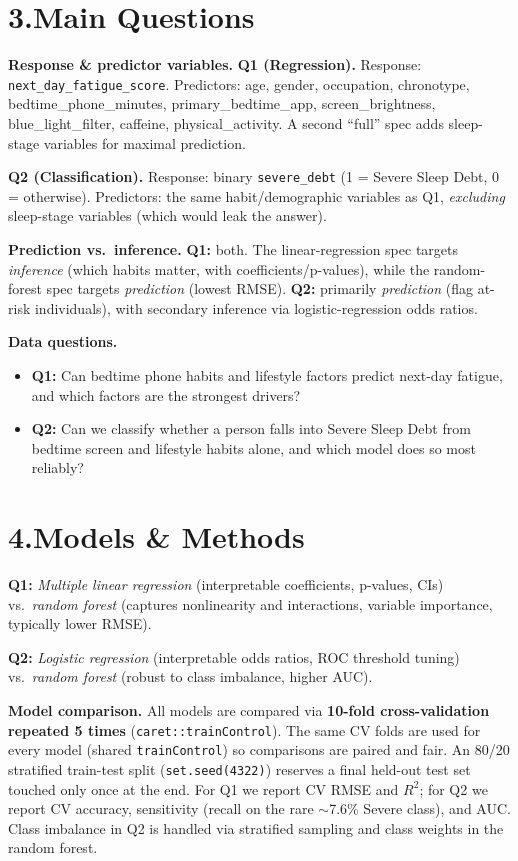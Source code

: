 \documentclass[10pt]{article}
\begin{document}
\section*{3.\quad Main Questions}

\textbf{Response \& predictor variables.}\quad
\textbf{Q1 (Regression).} Response: \texttt{next\_day\_fatigue\_score}.
Predictors: age, gender, occupation, chronotype, bedtime\_phone\_minutes, primary\_bedtime\_app, screen\_brightness, blue\_light\_filter, caffeine, physical\_activity. A second ``full'' spec adds sleep-stage variables for maximal prediction.

\textbf{Q2 (Classification).} Response: binary \texttt{severe\_debt} (1 = Severe Sleep Debt, 0 = otherwise).
Predictors: the same habit/demographic variables as Q1, \emph{excluding} sleep-stage variables (which would leak the answer).

\textbf{Prediction vs.\ inference.}\quad
\textbf{Q1:} both. The linear-regression spec targets \emph{inference} (which habits matter, with coefficients/p-values), while the random-forest spec targets \emph{prediction} (lowest RMSE).
\textbf{Q2:} primarily \emph{prediction} (flag at-risk individuals), with secondary inference via logistic-regression odds ratios.

\textbf{Data questions.}\quad
\begin{itemize}
  \item \textbf{Q1:} Can bedtime phone habits and lifestyle factors predict next-day fatigue, and which factors are the strongest drivers?
  \item \textbf{Q2:} Can we classify whether a person falls into Severe Sleep Debt from bedtime screen and lifestyle habits alone, and which model does so most reliably?
\end{itemize}

\section*{4.\quad Models \& Methods}

\textbf{Q1:} \emph{Multiple linear regression} (interpretable coefficients, p-values, CIs) vs.\ \emph{random forest} (captures nonlinearity and interactions, variable importance, typically lower RMSE).

\textbf{Q2:} \emph{Logistic regression} (interpretable odds ratios, ROC threshold tuning) vs.\ \emph{random forest} (robust to class imbalance, higher AUC).

\textbf{Model comparison.} All models are compared via \textbf{10-fold cross-validation repeated 5 times} (\texttt{caret::trainControl}). The same CV folds are used for every model (shared \texttt{trainControl}) so comparisons are paired and fair. An 80/20 stratified train-test split (\texttt{set.seed(4322)}) reserves a final held-out test set touched only once at the end. For Q1 we report CV RMSE and $R^2$; for Q2 we report CV accuracy, sensitivity (recall on the rare $\sim$7.6\% Severe class), and AUC. Class imbalance in Q2 is handled via stratified sampling and class weights in the random forest.
\end{document}
